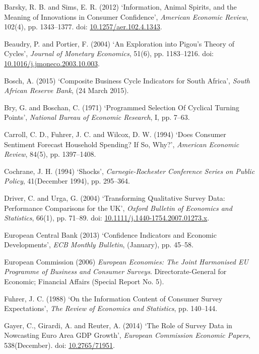 \documentclass[11pt,]{article}
\begin{document}
\hypertarget{ref-Barsky2012}{}
Barsky, R. B. and Sims, E. R. (2012) `Information, Animal Spirits, and
the Meaning of Innovations in Consumer Confidence', \emph{American
Economic Review}, 102(4), pp. 1343--1377. doi:
\href{https://doi.org/10.1257/aer.102.4.1343}{10.1257/aer.102.4.1343}.

\hypertarget{ref-Beaudry2004}{}
Beaudry, P. and Portier, F. (2004) `An Exploration into Pigou's Theory
of Cycles', \emph{Journal of Monetary Economics}, 51(6), pp. 1183--1216.
doi:
\href{https://doi.org/10.1016/j.jmoneco.2003.10.003}{10.1016/j.jmoneco.2003.10.003}.

\hypertarget{ref-Bosch2015}{}
Bosch, A. (2015) `Composite Business Cycle Indicators for South Africa',
\emph{South African Reserve Bank}, (24 March 2015).

\hypertarget{ref-Bry1971}{}
Bry, G. and Boschan, C. (1971) `Programmed Selection Of Cyclical Turning
Points', \emph{National Bureau of Economic Research}, I, pp. 7--63.

\hypertarget{ref-Carroll1994}{}
Carroll, C. D., Fuhrer, J. C. and Wilcox, D. W. (1994) `Does Consumer
Sentiment Forecast Household Spending? If So, Why?', \emph{American
Economic Review}, 84(5), pp. 1397--1408.

\hypertarget{ref-Cochrane1994}{}
Cochrane, J. H. (1994) `Shocks', \emph{Carnegie-Rochester Conference
Series on Public Policy}, 41(December 1994), pp. 295--364.

\hypertarget{ref-Driver2004}{}
Driver, C. and Urga, G. (2004) `Transforming Qualitative Survey Data:
Performance Comparisons for the UK', \emph{Oxford Bulletin of Economics
and Statistics}, 66(1), pp. 71--89. doi:
\href{https://doi.org/10.1111/j.1440-1754.2007.01273.x}{10.1111/j.1440-1754.2007.01273.x}.

\hypertarget{ref-ECB2013}{}
European Central Bank (2013) `Confidence Indicators and Economic
Developments', \emph{ECB Monthly Bulletin}, (January), pp. 45--58.

\hypertarget{ref-EC2006}{}
European Commission (2006) \emph{European Economies: The Joint
Harmonised EU Programme of Business and Consumer Surveys}.
Directorate-General for Economic; Financial Affairs (Special Report No.
5).

\hypertarget{ref-Fuhrer1988}{}
Fuhrer, J. C. (1988) `On the Information Content of Consumer Survey
Expectations', \emph{The Review of Economics and Statistics}, pp.
140--144.

\hypertarget{ref-Gayer2014}{}
Gayer, C., Girardi, A. and Reuter, A. (2014) `The Role of Survey Data in
Nowcasting Euro Area GDP Growth', \emph{European Commission Economic
Papers}, 538(December). doi:
\href{https://doi.org/10.2765/71951}{10.2765/71951}.
\end{document}
